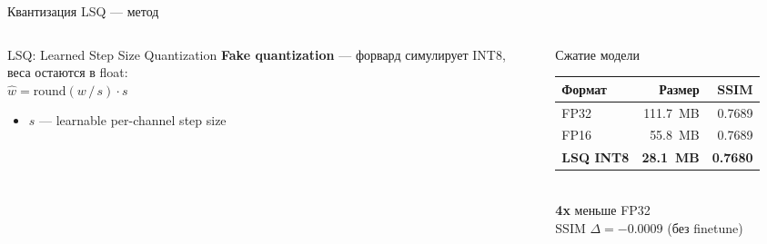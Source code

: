 \documentclass[aspectratio=169,11pt]{beamer}
\newcommand{\hlrow}{\rowcolor{hlgreen}}
\begin{document}
\begin{frame}{Квантизация LSQ — метод}
  \begin{columns}[T]
    \begin{column}{0.52\textwidth}
      \begin{block}{LSQ: Learned Step Size Quantization}
        \textbf{Fake quantization} — форвард симулирует INT8,\\
        веса остаются в float:\\[0.4em]
        \hspace{2em}$\hat{w} = \mathrm{round}(w\,/\,s)\cdot s$\\[0.4em]
        \begin{itemize}
          \item $s$ — learnable per-channel step size
        \end{itemize}
      \end{block}
      \vspace{0.4em}
      \footnotesize\vspace{0.3em}
    \end{column}
    \begin{column}{0.44\textwidth}
      \begin{alertblock}{Сжатие модели}
        \renewcommand{\arraystretch}{1.15}
        \begin{tabular}{@{}lrr@{}}
          \toprule
          Формат & Размер & SSIM \\
          \midrule
          FP32     & 111.7~MB & 0.7689 \\
          FP16     &  55.8~MB & 0.7689 \\
          \hlrow
          \textbf{LSQ INT8} & \textbf{28.1~MB} & \textbf{0.7680} \\
          \bottomrule
        \end{tabular}\\[0.3em]
        \textbf{4x} меньше FP32\\[0.1em]
        SSIM $\Delta = {-}0.0009$ (без finetune)\\[0.2em]
      \end{alertblock}
    \end{column}
  \end{columns}
\end{frame}
\end{document}
